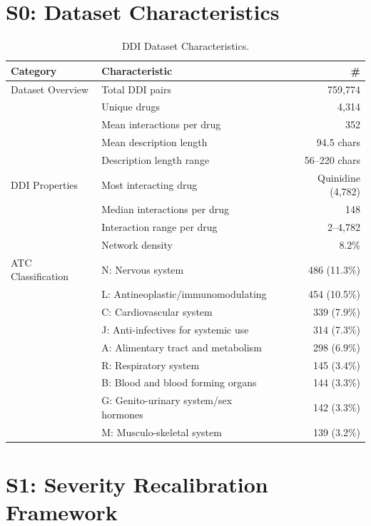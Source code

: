 \documentclass[12pt,a4paper]{article}
\begin{document}
\vspace{1em}

\section{S0: Dataset Characteristics}
\label{sec:s0}

\begin{table}[H]
\centering
\caption{DDI Dataset Characteristics.}
\label{tab:ddi_dataset}
\begin{tabular}{@{}llr@{}}
\toprule
\textbf{Category} & \textbf{Characteristic} & \textbf{\#} \\
\midrule
Dataset Overview & Total DDI pairs & 759,774 \\
 & Unique drugs & 4,314 \\
 & Mean interactions per drug & 352 \\
 & Mean description length & 94.5 chars \\
 & Description length range & 56--220 chars \\
\midrule
DDI Properties & Most interacting drug & Quinidine (4,782) \\
 & Median interactions per drug & 148 \\
 & Interaction range per drug & 2--4,782 \\
 & Network density & 8.2\% \\
\midrule
ATC Classification & N: Nervous system & 486 (11.3\%) \\
 & L: Antineoplastic/immunomodulating & 454 (10.5\%) \\
 & C: Cardiovascular system & 339 (7.9\%) \\
 & J: Anti-infectives for systemic use & 314 (7.3\%) \\
 & A: Alimentary tract and metabolism & 298 (6.9\%) \\
 & R: Respiratory system & 145 (3.4\%) \\
 & B: Blood and blood forming organs & 144 (3.3\%) \\
 & G: Genito-urinary system/sex hormones & 142 (3.3\%) \\
 & M: Musculo-skeletal system & 139 (3.2\%) \\
\bottomrule
\end{tabular}
\end{table}

\newpage
\section{S1: Severity Recalibration Framework}
\label{sec:s1}
\end{document}
